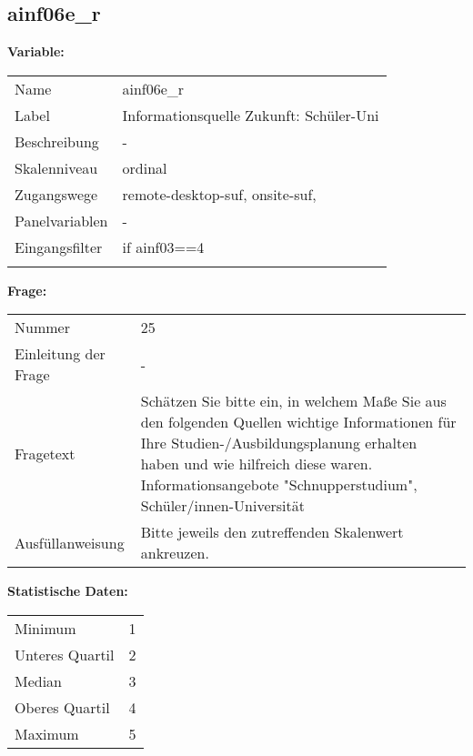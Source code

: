 	
	
	\subsection{ainf06e\_r}
	\label{subSection:ainf06e_r}

	\noindent\textbf{Variable:}\\
		\begin{tabular}{lL{11.3cm}}
			\label{tableVariable:ainf06e_r}
			Name & ainf06e\_r \\
			Label & Informationsquelle Zukunft: Schüler-Uni \\
			Beschreibung & - \\
			Skalenniveau & ordinal \\
			Zugangswege &
				remote-desktop-suf,
				onsite-suf,
 \\
			Panelvariablen & -
			 \\
			Eingangsfilter & if ainf03==4 \\
 \\
		\end{tabular}

		\vspace*{1 cm}
		\noindent\textbf{Frage:}\\
		\begin{tabular}{lL{11.3cm}}
			\label{tableQuestion:ainf06e_r}
			Nummer & 25 \\
			Einleitung der Frage & - \\
			Fragetext & Schätzen Sie bitte ein, in welchem Maße Sie aus den folgenden Quellen wichtige Informationen für Ihre Studien-/Ausbildungsplanung erhalten haben und wie hilfreich diese waren.
Informationsangebote
"Schnupperstudium", Schüler/innen-Universität \\
			Ausfüllanweisung & Bitte jeweils den zutreffenden Skalenwert ankreuzen. \\
		\end{tabular}


		\vspace*{1 cm}
		\noindent\textbf{Statistische Daten:}\\
			\begin{tabular}{ll}
				\label{tableStatistics:ainf06e_r}
					Minimum & 1 \\
					Unteres Quartil & 2 \\
					Median & 3 \\
					Oberes Quartil & 4 \\
					Maximum & 5 \\
			\end{tabular}



